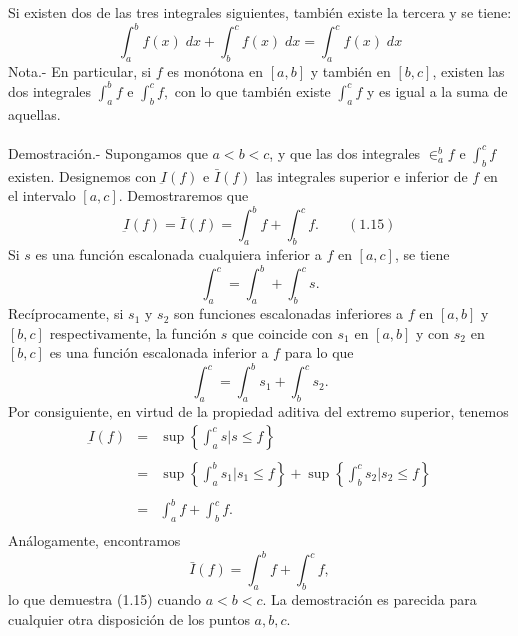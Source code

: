 \begin{multicols}{2}
\begin{teo} Si existen dos de las tres integrales siguientes, también existe la tercera y se tiene: $$\int_a^b f(x) \; dx + \int_b^c f(x) \; dx = \int_a^c f(x) \; dx$$
    Nota.- \; En particular, si $f$ es monótona en $[a,b]$ y también en $[b,c]$, existen las dos integrales $\int_a^b f$ e $\int_b^c f,$ con lo que también existe $\int_a^c f$ y es igual a la suma de aquellas.\\\\
    Demostración.-\; Supongamos que $a<b<c$, y que las dos integrales $\in_a^b f$ e $\int_b^c f$ existen. Designemos con $\underbar{I}(f)$ e $\bar{I}(f)$ las integrales superior e inferior de $f$ en el intervalo $[a,c]$. Demostraremos que $$\underbar{I}(f) = \bar{I}(f) = \int_a^b f + \int_b^c f. \qquad (1.15)$$
    Si $s$ es una función escalonada cualquiera inferior a $f$ en $[a,c]$, se tiene $$\int_a^c = \int_a^b + \int_b^c s.$$
    Recíprocamente, si $s_1$ y $s_2$ son funciones escalonadas inferiores a $f$ en $[a,b]$ y $[b,c]$ respectivamente, la función $s$ que coincide con $s_1$ en $[a,b]$ y con $s_2$ en $[b,c]$ es una función escalonada inferior a $f$ para lo que $$\int_a^c = \int_a^b s_1 + \int_b^c s_2.$$
    Por consiguiente, en virtud de la propiedad aditiva del extremo superior, tenemos 
    $$\begin{array}{rcl}
	\underbar{I}(f) &=& \sup\left\{\int_a^c s | s\leq f\right\} \\\\
			&=& \sup \left\{\int_a^b s_1 | s_1 \leq f\right\} + \sup \left\{\int_b^c s_2 | s_2 \leq f\right\}\\\\
			&=& \int_a^b f + \int_b^c f.\\
    \end{array}$$
    Análogamente, encontramos $$\bar{I}(f) = \int_a^b f + \int_b^c f,$$
    lo que demuestra (1.15) cuando $a<b<c$. La demostración es parecida para cualquier otra disposición de los puntos $a,b,c$.\\\\

\end{teo}


\end{multicols}
